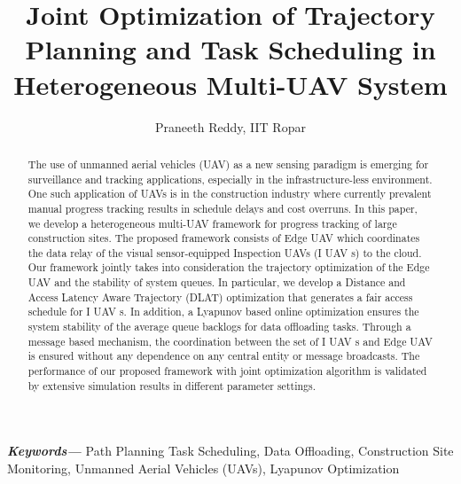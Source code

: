 \documentclass[twocolumn]{article}
\title{Joint Optimization of Trajectory Planning and Task Scheduling in
Heterogeneous Multi-UAV System}
\author{Praneeth Reddy, IIT Ropar}
\date{}
\providecommand{\keywords}[1]
{
  \textbf{\textit{Keywords---}} #1
}
\begin{document}
\maketitle
\begin{abstract}
    The use of unmanned aerial vehicles (UAV) as a new sensing paradigm is emerging for surveillance and tracking
applications, especially in the infrastructure-less environment. One such application of UAVs is in the construction industry where currently prevalent manual progress
tracking results in schedule delays and cost overruns. In
this paper, we develop a heterogeneous multi-UAV framework for progress tracking of large construction sites. The
proposed framework consists of Edge UAV which coordinates the data relay of the visual sensor-equipped Inspection UAVs (I UAV s) to the cloud. Our framework jointly
takes into consideration the trajectory optimization of the
Edge UAV and the stability of system queues. In particular, we develop a Distance and Access Latency Aware
Trajectory (DLAT) optimization that generates a fair access schedule for I UAV s. In addition, a Lyapunov based
online optimization ensures the system stability of the average queue backlogs for data offloading tasks. Through a
message based mechanism, the coordination between the
set of I UAV s and Edge UAV is ensured without any
dependence on any central entity or message broadcasts.
The performance of our proposed framework with joint
optimization algorithm is validated by extensive simulation results in different parameter settings.
\end{abstract}
\keywords{Path Planning Task Scheduling, Data Offloading, Construction Site Monitoring, Unmanned Aerial
Vehicles (UAVs), Lyapunov Optimization}
\end{document}
